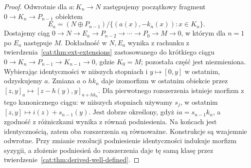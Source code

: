 \begin{proof}
Odwrotnie dla $a:K_n\to N$ zastępujemy początkowy fragment $0\to K_n\to P_{n-1}$ obiektem
\[
 E_a=(N\oplus P_{n-1})/\{(a(x),-k_n(x)):x\in K_n\}.
\]
Dostajemy ciąg $0\to N\to E_a\to P_{n-2}\to\cdots\to P_0\to M\to0$, w którym dla $n=1$ po $E_a$ następuje $M$. Dokładność w $N,E_a$ wynika z rachunku z twierdzenia~\ref{cat:thm:ext-extensions} zastosowanego do krótkiego ciągu $0\to K_n\to P_{n-1}\to K_{n-1}\to0$, gdzie $K_0=M$; pozostała część jest niezmieniona. Wybierając identyczności w niższych stopniach i $y\mapsto[0,y]$ w ostatnim, odzyskujemy $a$. Zmiana $a$ o $hk_n$ daje izomorfizm w ostatnim obiekcie przez $[z,y]_a\mapsto[z-h(y),y]_{a+hk_n}$. Dla pierwotnego rozszerzenia istnieje morfizm z tego kanonicznego ciągu: w niższych stopniach używamy $s_j$, w ostatnim $[z,y]\mapsto i(z)+s_{n-1}(y)$. Jest dobrze określony, gdyż $ia=s_{n-1}k_n$, a zgodność z różniczkami wynika z równań podniesienia. Na końcach jest identycznością, zatem oba rozszerzenia są równoważne. Konstrukcje są wzajemnie odwrotne. Przy zmianie rezolucji podniesienie identyczności indukuje morfizm syzygii, a złożenie podniesień do rozszerzenia daje tę samą klasę przez twierdzenie~\ref{cat:thm:derived-well-defined}.
\end{proof}

